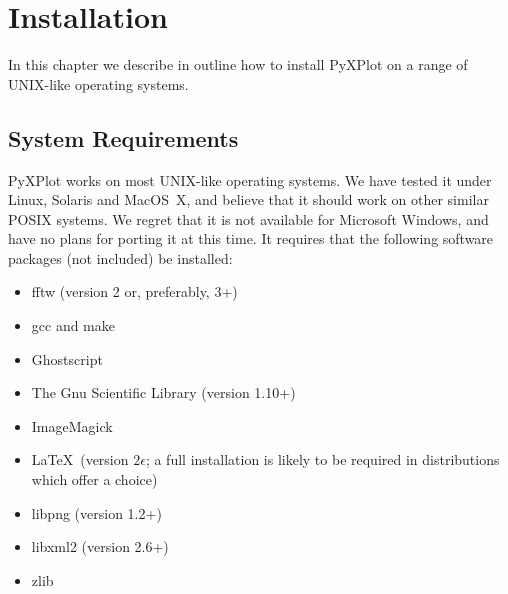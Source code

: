 %
%
%
%
%



\chapter{Installation}

\label{ch:installation}

In this chapter we describe in outline how to install PyXPlot on a range of
UNIX-like operating systems.

\section{System Requirements}

PyXPlot works on most UNIX-like operating systems. We have tested it under
Linux, Solaris and MacOS~X, and believe that it
should work on other similar POSIX systems. We regret that it is not available
for Microsoft Windows, and have no plans for porting it at this time. It
requires that the following software packages (not included) be
installed:

\vspace{0.5cm}
\begin{itemize}
\item fftw (version 2 or, preferably, 3+) 
\item gcc and make
\item Ghostscript 
\item The Gnu Scientific Library (version 1.10+) 
\item ImageMagick 
\item \LaTeX\ (version $2\epsilon$; a full installation is likely to be required in distributions which offer a choice) 
\item libpng (version 1.2+) 
\item libxml2 (version 2.6+) 
\item zlib 
\end{itemize}
\vspace{0.5cm}

